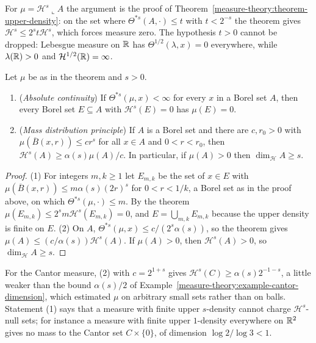 For $\mu = \mathcal{H}^s\llcorner A$ the argument is the proof of Theorem~\ref{measure-theory:theorem-upper-density}: on the set where $\Theta^{*s}(A, \cdot) \leq t$ with $t < 2^{-s}$ the theorem
gives $\mathcal{H}^s \leq 2^st\mathcal{H}^s$, which forces measure zero. The hypothesis $t > 0$ cannot be dropped: Lebesgue measure on $\mathbb{R}$ has $\Theta^{1/2}(\lambda, x) = 0$ everywhere, while
$\lambda(\mathbb{R}) > 0$ and $\mathcal{H}^{1/2}(\mathbb{R}) = \infty$.

\begin{corollary}\label{measure-theory:corollary-density-consequences}
Let $\mu$ be as in the theorem and $s > 0$.
\begin{enumerate}
\item (\emph{Absolute continuity}) If $\Theta^{*s}(\mu, x) < \infty$ for every $x$ in a Borel set $A$, then every Borel set $E \subseteq A$ with $\mathcal{H}^s(E) = 0$ has $\mu(E) = 0$.
\item (\emph{Mass distribution principle}) If $A$ is a Borel set and there are $c, r_0 > 0$ with $\mu(\overline{B}(x, r)) \leq cr^s$ for all $x \in A$ and $0 < r < r_0$, then
$\mathcal{H}^s(A) \geq \alpha(s)\mu(A)/c$. In particular, if $\mu(A) > 0$ then $\dim_{\mathcal{H}}A \geq s$.
\end{enumerate}
\end{corollary}

\begin{proof}
(1) For integers $m, k \geq 1$ let $E_{m,k}$ be the set of $x \in E$ with $\mu(\overline{B}(x, r)) \leq m\alpha(s)(2r)^s$ for $0 < r < 1/k$, a Borel set as in the proof above, on which
$\Theta^{*s}(\mu, \cdot) \leq m$. By the theorem $\mu(E_{m,k}) \leq 2^sm\mathcal{H}^s(E_{m,k}) = 0$, and $E = \bigcup_{m,k}E_{m,k}$ because the upper density is finite on $E$.
(2) On $A$, $\Theta^{*s}(\mu, x) \leq c/(2^s\alpha(s))$, so the theorem gives $\mu(A) \leq (c/\alpha(s))\mathcal{H}^s(A)$. If $\mu(A) > 0$, then $\mathcal{H}^s(A) > 0$, so $\dim_{\mathcal{H}}A \geq s$.
\end{proof}

For the Cantor measure, (2) with $c = 2^{1+s}$ gives $\mathcal{H}^s(C) \geq \alpha(s)2^{-1-s}$, a little weaker than the bound $\alpha(s)/2$ of Example~\ref{measure-theory:example-cantor-dimension}, which
estimated $\mu$ on arbitrary small sets rather than on balls. Statement (1) says that a measure with finite upper $s$-density cannot charge $\mathcal{H}^s$-null sets; for instance a measure with finite
upper $1$-density everywhere on $\mathbb{R}^2$ gives no mass to the Cantor set $C \times \{0\}$, of dimension $\log 2/\log 3 < 1$.

